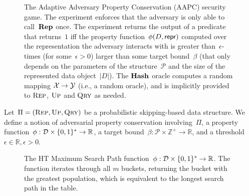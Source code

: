 \begin{figure}[thp]
\begin{pchstack}[boxed,center,space=0.5em]
\begin{pcvstack}[space=0.45em]
	\end{pcvstack}
 \end{pchstack}


  \caption[The AAPC Security Model.]{The Adaptive Adversary Property Conservation (AAPC) security game. The experiment enforces that the adversary is only able to call~$\textup{\textbf{Rep}}\hspace{0.5pt}$ once. The experiment returns the output of a predicate that returns~$1$ iff the property function~$\phi(D,\mathsf{repr})$ computed over the representation the adversary interacts with is greater than~$\epsilon$-times (for some~$\epsilon > 0$) larger than some target bound~$\beta$ (that only depends on the parameters of the structure~$\mathcal{P}$ and the size of the represented data object~$|D|$). The $\textup{\textbf{Hash}}\hspace{0.5pt}$ oracle computes a random mapping $\mathcal{X}\to\mathcal{Y}$ (i.e., a random oracle), and is implicitly provided to $\textnormal{\textsc{Rep}}$, $\textnormal{\textsc{Up}}$ and $\textnormal{\textsc{Qry}}$ as needed.}
  \label{fig:aapc}
\end{figure}

Let~$\Pi = (\textnormal{\textsc{Rep}},\textnormal{\textsc{Up}},\textnormal{\textsc{Qry}})$ be a probabilistic skipping-based  data structure. We define a notion of adversarial property conservation involving~$\Pi$, a property function~$\phi : \mathcal{D} \times \{0,1\}^{*} \rightarrow \mathbb{R}$, a target bound~$\beta : \mathcal{P} \times \mathbb{Z}^{+} \rightarrow \mathbb{R}$, and a threshold $\epsilon \in \mathbb{R},\epsilon > 0$.   


\begin{figure}
            \centering
            \begin{pchstack}[boxed,center,space=0.5em]
            \end{pchstack}
      \caption[HT Maximum Search Path.]{The HT Maximum Search Path function~$\phi : \mathcal{D} \times \{0,1 \}^{*} \rightarrow  \mathbb{R}$. The function iterates through all $m$ buckets, returning the bucket with the greatest population, which is equivalent to the longest search path in the table.
      } 
      \label{fig:ht-pop}
\end{figure}

